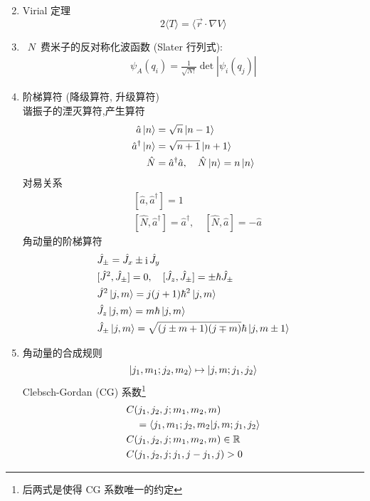 \documentclass[11pt,a4paper,twocolumn,fleqn]{article}%
\DeclareMathOperator{\mi}{i}
\renewcommand{\[}{~$}
\renewcommand{\]}{$~}%
\begin{document}
\begin{enumerate}
\begin{equation}
  	\end{equation}
  \item Virial 定理
  	\begin{equation}
  	 2\langle T\rangle = \langle \vec r \cdot \nabla V\rangle
  	\end{equation}
  \item \[N\]费米子的反对称化波函数 (Slater 行列式): 
   \begin{align}
    \psi_A(q_i) = \frac{1}{\sqrt{N!}}\det|\psi_i(q_j)|
   \end{align}
  \item 阶梯算符 (降级算符, 升级算符)\\
  	谐振子的湮灭算符,产生算符
  	\begin{align}
  	 \hat a\ket{n} &= \sqrt n\ket{n-1} \\
  	 \hat a^\dagger\ket{n} &= \sqrt{n+1}\ket{n+1} \\
  	 \hat N &= \hat a^\dagger\hat a , \quad \hat N\ket{n} = n\ket{n}
  	\end{align}
  	对易关系
  	\begin{align}
  	 &[\hat a, \hat a^\dagger] = 1 \\
  	 &[\hat N,\hat a^\dagger] = \hat a ^\dagger,\quad [\hat N,\hat a] = -\hat a
  	\end{align}
  	角动量的阶梯算符
  	\begin{align}
  	 &\hat J_{\pm} = \hat J_x \pm\mi\hat J_y  \\
  	 &[\hat J^2, \hat J_{\pm}]= 0,\quad [\hat J_z,\hat J_{\pm}] = \pm\hbar\hat J_{\pm} \\
  	 &\hat J^2\ket{j,m} = j(j+1)\hbar^2\ket{j,m}\\
  	 &\hat J_z\ket{j,m} = m\hbar\ket{j,m} \\
  	 &\hat J_\pm \ket{j,m} = \sqrt{(j\pm m + 1)(j\mp m)}\hbar\ket{j,m\pm 1}
  	\end{align}
  \item 角动量的合成规则
  	\begin{equation}
  	 \ket{j_1,m_1;j_2,m_2}\mapsto \ket{j,m;j_1,j_2}
  	\end{equation}
  	Clebsch-Gordan (CG) 系数\footnote{后两式是使得 CG 系数唯一的约定}
  	\begin{align}
  	 &C(j_1,j_2,j;m_1,m_2,m) \nonumber \\
  	  &\quad = \braket{j_1,m_1;j_2,m_2|j,m;j_1,j_2} \\
  	 &C(j_1,j_2,j;m_1,m_2,m) \in \mathbb R \\
  	 &C(j_1,j_2,j;j_1,j-j_1,j) >0
  	\end{align}

\end{enumerate}
\end{document}
